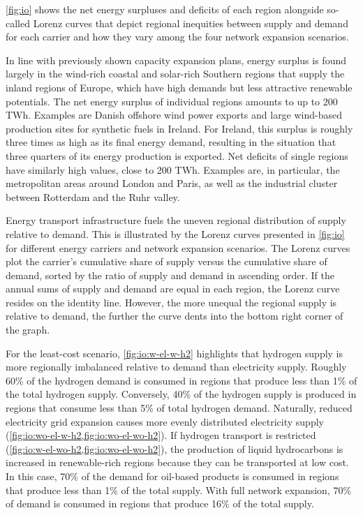 \cref{fig:io} shows the net energy surpluses and deficits of each region
alongside so-called Lorenz curves that depict regional inequities between supply
and demand for each carrier and how they vary among the four network expansion
scenarios.

In line with previously shown capacity expansion plans, energy surplus is found
largely in the wind-rich coastal and solar-rich Southern regions that supply the
inland regions of Europe, which have high demands but less attractive renewable
potentials. The net energy surplus of individual regions amounts to up to 200
TWh. Examples are Danish offshore wind power exports and large wind-based
production sites for synthetic fuels in Ireland. For Ireland, this surplus is
roughly three times as high as its final energy demand, resulting in the
situation that three quarters of its energy production is exported. Net deficits
of single regions have similarly high values, close to 200 TWh. Examples are, in
particular, the metropolitan areas around London and Paris, as well as the
industrial cluster between Rotterdam and the Ruhr valley.

Energy transport infrastructure fuels the uneven regional distribution of supply
relative to demand. This is illustrated by the Lorenz curves presented in
\cref{fig:io} for different energy carriers and network expansion scenarios. The
Lorenz curves plot the carrier's cumulative share of supply versus the
cumulative share of demand, sorted by the ratio of supply and demand in
ascending order. If the annual sums of supply and demand are equal in each
region, the Lorenz curve resides on the identity line. However, the more unequal
the regional supply is relative to demand, the further the curve dents into the
bottom right corner of the graph.

For the least-cost scenario, \cref{fig:io:w-el-w-h2} highlights that hydrogen
supply is more regionally imbalanced relative to demand than electricity supply.
Roughly 60\% of the hydrogen demand is consumed in regions that produce less
than 1\% of the total hydrogen supply. Conversely, 40\% of the hydrogen supply
is produced in regions that consume less than 5\% of total hydrogen demand.
Naturally, reduced electricity grid expansion causes more evenly distributed
electricity supply (\cref{fig:io:wo-el-w-h2,fig:io:wo-el-wo-h2}). If hydrogen
transport is restricted (\cref{fig:io:w-el-wo-h2,fig:io:wo-el-wo-h2}), the
production of liquid hydrocarbons is increased in renewable-rich regions because
they can be transported at low cost. In this case, 70\% of the demand for
oil-based products is consumed in regions that produce less than 1\% of the
total supply. With full network expansion, 70\% of demand is consumed in regions
that produce 16\% of the total supply.



